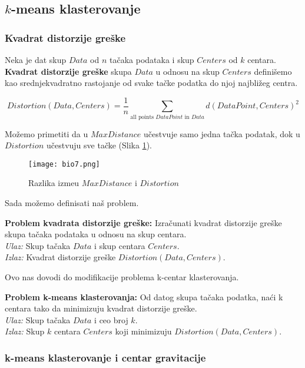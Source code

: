 \subsection{$k$-means klasterovanje}

\subsubsection{Kvadrat distorzije greške}

Neka je dat skup $Data$ od $n$ tačaka podataka i skup $Centers$ od $k$ centara.  \textbf{Kvadrat distorzije greške} skupa $Data$ u odnosu na skup $Centers$ definišemo kao srednjekvadratno rastojanje od svake tačke podatka do njoj najbližeg centra. 

$$Distortion(Data, Centers) = \frac{1}{n} \sum_{\text{all points }DataPoint\text{ in }Data} d(DataPoint, Centers)^2$$

Možemo primetiti da u $MaxDistance$ učestvuje samo jedna tačka podatak, dok u $Distortion$ učestvuju sve tačke (Slika \ref{slika 8}).
\begin{figure}[h]
    \centering
    \texttt{[image: bio7.png]}
    \caption{Razlika izme\dj u $MaxDistance$ i $Distortion$}
    \label{slika 8}
\end{figure}

Sada možemo definisati naš problem.

\begin{tcolorbox}
\textbf{Problem kvadrata distorzije greške:} Izračunati kvadrat distorzije greške skupa tačaka podataka u odnosu na skup centara.\\
\textit{Ulaz:} Skup tačaka $Data$ i skup centara $Centers$.\\
\textit{Izlaz:} Kvadrat distorzije greške $Distortion(Data, Centers)$.
\end{tcolorbox}

Ovo nas dovodi do modifikacije problema k-centar klasterovanja.

\begin{tcolorbox}
\textbf{Problem k-means klasterovanja:} Od datog skupa tačaka podatka, naći k centara tako da minimizuju kvadrat distorzije greške.\\
\textit{Ulaz:} Skup tačaka $Data$ i ceo broj $k$.\\
\textit{Izlaz:} Skup $k$ centara $Centers$ koji minimizuju $Distortion(Data, Centers)$.
\end{tcolorbox}

\subsubsection{k-means klasterovanje i centar gravitacije}

